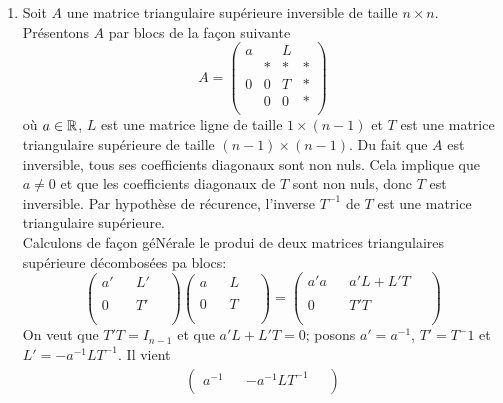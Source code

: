 \begin{enumerate}[(1)]
  \item Soit $A$ une matrice triangulaire supérieure inversible de taille $n\times n$. Présentons $A$ par blocs de la façon suivante
    $$A = \begin{pmatrix}
      a &   & L &   \\
        & * & * & * \\
      0 & 0 & T & * \\
        & 0 & 0 & * \\
    \end{pmatrix}$$
    où $a \in \mathbb{R}$, $L$ est une matrice ligne de taille $1 \times (n-1)$ et $T$ est une matrice triangulaire supérieure de taille $(n-1)\times(n-1)$. Du fait que $A$ est inversible, tous ses coefficients diagonaux sont non nuls. Cela implique que $a \neq 0$ et que les coefficients diagonaux de $T$ sont non nuls, donc $T$ est inversible. Par hypothèse de récurence, l'inverse $T^{-1}$ de $T$ est une matrice triangulaire supérieure. \\
    Calculons de façon géNérale le produi de deux matrices triangulaires supérieure décombosées pa blocs:
    $$\begin{pmatrix}
        a' &   & L' & ~ \\
          &   &   &  ~  \\
        0 &   & T' & ~  \\
          &   &   &  ~ \\
      \end{pmatrix}
      \begin{pmatrix}
        a &   & L &  ~ \\
          &   &   &  ~ \\
        0 &   & T &  ~ \\
          &   &   &  ~ \\
      \end{pmatrix}
      =\begin{pmatrix}
        a' a &   & a' L + L' T & ~ \\
          &   &   & ~ \\
        0 &   & T' T & ~ \\
          &   &   & ~ \\
      \end{pmatrix}$$
    On veut que $T' T = I_{n-1}$ et que $a' L + L' T = 0$; posons $a' = a^{-1}$, $T' = T^-{1}$ et $L' = - a^{-1} L T^{-1}$. Il vient
    \begin{eqnarray*}
      \begin{pmatrix}
        a^{-1} &   & -a^{-1} L T^{-1} & ~ \\

\end{pmatrix}
\end{eqnarray*}
\end{enumerate}
